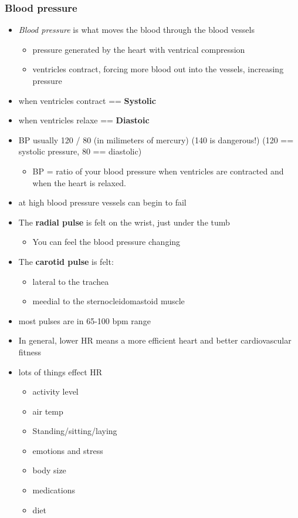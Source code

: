 \documentclass{article}
\theoremstyle{definition}
\begin{document}
\subsubsection{Blood pressure}
\begin{itemize}
	\item \textit{Blood pressure}  is what moves the blood through the blood vessels
		\begin{itemize}
			\item pressure generated by the heart with ventrical compression
			\item ventricles contract, forcing more blood out into the vessels, increasing pressure
		\end{itemize}
	\item when ventricles contract == \textbf{Systolic} 
	\item when ventricles relaxe == \textbf{Diastoic} 
	\item BP usually 120 / 80 (in milimeters of mercury) (140 is dangerous!) (120 == systolic pressure, 80 == diastolic)
		\begin{itemize}
			\item BP = ratio of your blood pressure when ventricles are contracted and when the heart is relaxed.
		\end{itemize}
	\item at high blood pressure vessels can begin to fail
	\item The \textbf{radial pulse}  is felt on the wrist, just under the tumb
		\begin{itemize}
			\item You can feel the blood pressure changing
		\end{itemize}
	\item The \textbf{carotid pulse} is felt:
		\begin{itemize}
			\item lateral to the trachea
			\item meedial to the sternocleidomastoid muscle
		\end{itemize}
	\item most pulses are in 65-100 bpm range
	\item In general, lower HR means a more efficient heart and better cardiovascular fitness
	\item lots of things effect HR
		\begin{itemize}
			\item activity level
			\item air temp
			\item Standing/sitting/laying
			\item emotions and stress
			\item body size
			\item medications
			\item diet
		\end{itemize}
\end{itemize}
\end{document}
